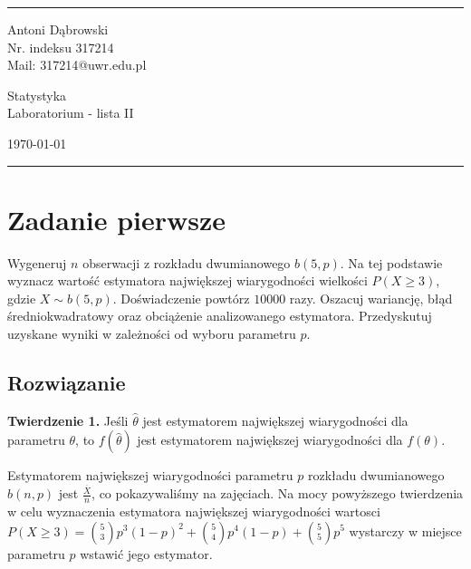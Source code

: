 \documentclass[a4paper]{article}
\begin{document}

\fancyhead[C]{}
\hrule \medskip %
\begin{minipage}{0.295\textwidth} 
\raggedright
\footnotesize
Antoni Dąbrowski \hfill\\   
Nr. indeksu 317214\hfill\\
Mail: 317214@uwr.edu.pl
\end{minipage}
\begin{minipage}{0.4\textwidth} 
\centering 
\large 
Statystyka\\ 
\normalsize 
Laboratorium - lista II\\ 
\end{minipage}
\begin{minipage}{0.295\textwidth} 
\raggedleft
\today\hfill\\
\end{minipage}
\medskip\hrule 
\bigskip



\section{Zadanie pierwsze}
Wygeneruj $n$ obserwacji z rozkładu dwumianowego $b(5,p)$. Na tej podstawie wyznacz wartość estymatora największej wiarygodności wielkości $P(X\geq3)$, gdzie $X\sim b(5,p)$. Doświadczenie powtórz $10000$ razy. Oszacuj wariancję, błąd średniokwadratowy oraz obciążenie analizowanego estymatora. Przedyskutuj uzyskane wyniki w zależności od wyboru parametru $p$.

\subsection{Rozwiązanie}
\textbf{Twierdzenie 1.}
Jeśli $\hat{\theta}$ jest estymatorem największej wiarygodności dla parametru $\theta$, to $f(\hat{\theta})$ jest estymatorem największej wiarygodności dla $f(\theta)$.
\newline

Estymatorem największej wiarygodności parametru $p$ rozkładu dwumianowego $b(n,p)$ jest $\frac{\overline{X}}{n}$, co  pokazywaliśmy na zajęciach. Na mocy powyższego twierdzenia w celu wyznaczenia estymatora największej wiarygodności wartosci $P(X\geq3)={5\choose3}p^3(1-p)^2+{5\choose4}p^4(1-p)+{5\choose5}p^5$ wystarczy w miejsce parametru $p$ wstawić jego estymator.
\end{document}
